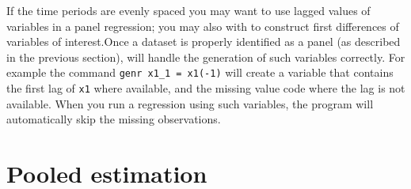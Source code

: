 If the time periods are evenly spaced you may want to use
      lagged values of variables in a panel regression; you may also
      with to construct first differences of variables of
      interest.Once a dataset is properly identified as a panel (as
      described in the previous section),
       will handle the generation of
      such variables correctly.  For example the command 
      \verb+genr x1_1 = x1(-1)+ will create a variable that contains
      the first lag of \verb+x1+ where available, and the
      missing value code where the lag is not available.
    When you run a regression using such variables, the program
      will automatically skip the missing observations.

\section{Pooled estimation}
\label{pooled-est}

